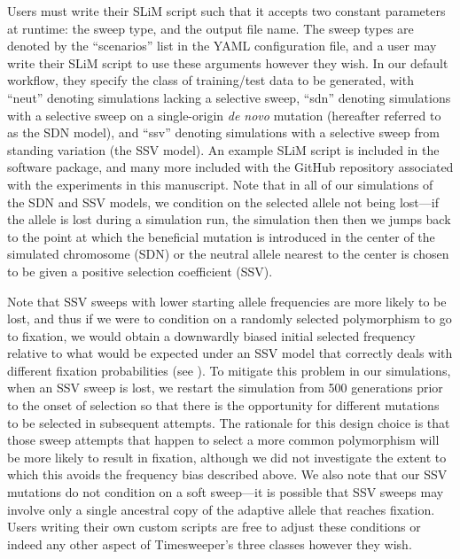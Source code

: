 Users must write their SLiM script such that it accepts two constant parameters at runtime: the sweep type, and the output file name. The sweep types are denoted by the “scenarios” list in the YAML configuration file, and a user may write their SLiM script to use these arguments however they wish. In our default workflow, they specify the class of training/test data to be generated, with “neut” denoting simulations lacking a selective sweep, “sdn” denoting simulations with a selective sweep on a single-origin \textit{de novo} mutation (hereafter referred to as the SDN model), and “ssv” denoting simulations with a selective sweep from standing variation (the SSV model). An example SLiM script is included in the software package, and many more included with the GitHub repository associated with the experiments in this manuscript. Note that in all of our simulations of the SDN and SSV models, we condition on the selected allele not being lost—if the allele is lost during a simulation run, the simulation then then we jumps back to the point at which the beneficial mutation is introduced in the center of the simulated chromosome (SDN) or the neutral allele nearest to the center is chosen to be given a positive selection coefficient (SSV).

Note that SSV sweeps with lower starting allele frequencies are more likely to be lost, and thus if we were to condition on a randomly selected polymorphism to go to fixation, we would obtain a downwardly biased initial selected frequency relative to what would be expected under an SSV model that correctly deals with different fixation probabilities (see \cite{hermissonSoftSweepsUnderstanding2017}). To mitigate this problem in our simulations, when an SSV sweep is lost, we restart the simulation from 500 generations prior to the onset of selection so that there is the opportunity for different mutations to be selected in subsequent attempts. The rationale for this design choice is that those sweep attempts that happen to select a more common polymorphism will be more likely to result in fixation, although we did not investigate the extent to which this avoids the frequency bias described above. We also note that our SSV mutations do not condition on a soft sweep—it is possible that SSV sweeps may involve only a single ancestral copy of the adaptive allele that reaches fixation. Users writing their own custom scripts are free to adjust these conditions or indeed any other aspect of Timesweeper’s three classes however they wish. 

